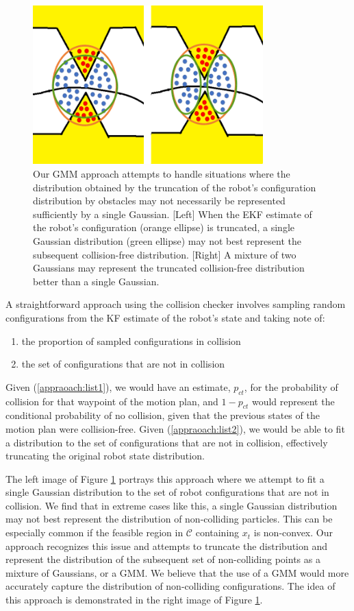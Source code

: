 \documentclass[journal]{IEEEtran}
\begin{document}
\begin{figure}[!t]
\centering
\includegraphics[width=3.5in]{combined_pic.png}
\caption{Our GMM approach attempts to handle situations where the distribution obtained by the truncation of the robot's configuration distribution by obstacles may not necessarily be represented sufficiently by a single Gaussian. [Left] When the EKF estimate of the robot's configuration (orange ellipse) is truncated, a single Gaussian distribution (green ellipse) may not best represent the subsequent collision-free distribution. [Right] A mixture of two Gaussians may represent the truncated collision-free distribution better than a single Gaussian.}
\label{ajaay_justification}
\end{figure}

A straightforward approach using the collision checker involves sampling random configurations from the KF estimate of the robot's state and taking note of:
\begin{enumerate}
\item the proportion of sampled configurations in collision \label{appraoach:list1}
\item the set of configurations that are not in collision \label{appraoach:list2}
\end{enumerate}

Given (\ref{appraoach:list1}), we would have an estimate, $p_{ct}$, for the probability of collision for that waypoint of the motion plan, and $1 - p_{ct}$ would represent the conditional probability of no collision, given that the previous states of the motion plan were collision-free. Given (\ref{appraoach:list2}), we would be able to fit a distribution to the set of configurations that are not in collision, effectively truncating the original robot state distribution.

The left image of Figure \ref{ajaay_justification} portrays this approach where we attempt to fit a single Gaussian distribution to the set of robot configurations that are not in collision. We find that in extreme cases like this, a single Gaussian distribution may not best represent the distribution of non-colliding particles. This can be especially common if the feasible region in $\mathcal{C}$ containing $x_t$ is non-convex. Our approach recognizes this issue and attempts to truncate the distribution and represent the distribution of the subsequent set of non-colliding points as a mixture of Gaussians, or a GMM. We believe that the use of a GMM would more accurately capture the distribution of non-colliding configurations. The idea of this approach is demonstrated in the right image of Figure \ref{ajaay_justification}.
\end{document}
